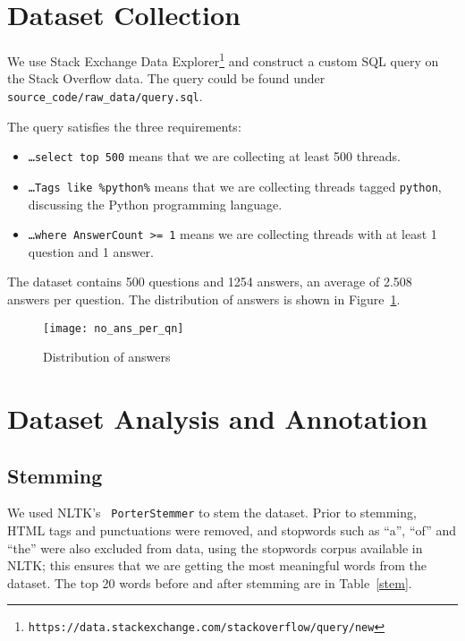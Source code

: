 \section{Dataset Collection}

We use Stack Exchange Data
Explorer\footnote{\texttt{https://data.stackexchange.com/stackoverflow/query/new}}
and construct a custom SQL query on the Stack Overflow data. The query could be
found under \texttt{source\_code/raw\_data/query.sql}.

The query satisfies the three requirements:

\begin{itemize}
    \item \texttt{\ldots select top 500} means that we are collecting at least
    500 threads.
    \item \texttt{\ldots Tags like \textquotesingle{}\%python\%\textquotesingle{}}
    means that we are collecting threads tagged \texttt{python}, discussing the
    Python programming language.
    \item \texttt{\ldots where AnswerCount >= 1} means we are collecting
    threads with at least 1 question and 1 answer.
\end{itemize}

The dataset contains 500 questions and 1254 answers, an average of 2.508 answers
per question. The distribution of answers is shown in Figure~\ref{ans-dist}.

\begin{figure}[htp]
\texttt{[image: no\_ans\_per\_qn]}
\caption{Distribution of answers}\label{ans-dist}
\end{figure}

\section{Dataset Analysis and Annotation}

\subsection{Stemming}

We used NLTK's~\cite{nltk} \texttt{PorterStemmer} to stem the dataset.
Prior to stemming, HTML tags and punctuations were removed, and stopwords
such as ``a'', ``of'' and ``the'' were also excluded from data, using the
stopwords corpus available in NLTK\@; this ensures that we are getting the
most meaningful words from the dataset. The top 20 words before and after
stemming are in Table~\ref{stem}.

